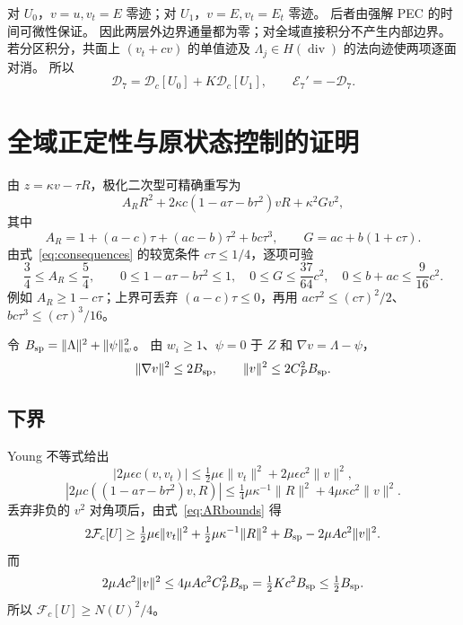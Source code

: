 \documentclass[UTF8,a4paper,11pt,fontset=none]{ctexart}
\numberwithin{equation}{section}
\theoremstyle{definition}
\theoremstyle{definition}
\newcommand{\eps}{\epsilon}
\newcommand{\Ecal}{\mathcal E}
\newcommand{\Dcal}{\mathcal D}
\newcommand{\Fc}{\mathcal F_c}
\newcommand{\Dc}{\mathcal D_c}
\DeclareMathOperator{\diver}{div}
\begin{document}
对 $U_0$，$v=u,v_t=E$ 零迹；对 $U_1$，$v=E,v_t=E_t$ 零迹。
后者由强解 PEC 的时间可微性保证。
因此两层外边界通量都为零；对全域直接积分不产生内部边界。
若分区积分，共面上 $(v_t+cv)$ 的单值迹及 $\Lambda_j\in H(\diver)$ 的法向迹使两项逐面对消。
所以
\begin{equation}\label{eq:D7exact}
 \Dcal_7=\Dc[U_0]+K\Dc[U_1],\qquad \Ecal_7'=-\Dcal_7.
\end{equation}

\section{全域正定性与原状态控制的证明}
\label{sec:coercivity}

由 $z=\kappa v-\tau R$，极化二次型可精确重写为
\begin{equation}\label{eq:reduced-polar}
 A_RR^2+2\kappa c(1-a\tau-b\tau^2)vR+\kappa^2Gv^2,
\end{equation}
其中
\[
 A_R=1+(a-c)\tau+(ac-b)\tau^2+bc\tau^3,
 \qquad G=ac+b(1+c\tau).
\]
由式~\eqref{eq:consequences} 的较宽条件 $c\tau\le1/4$，逐项可验
\begin{equation}\label{eq:ARbounds}
 \frac34\le A_R\le\frac54,\qquad
 0\le1-a\tau-b\tau^2\le1,
 \quad 0\le G\le\frac{37}{64}c^2,
 \quad 0\le b+ac\le\frac9{16}c^2.
\end{equation}
例如 $A_R\ge1-c\tau$；上界可丢弃 $(a-c)\tau\le0$，再用
$ac\tau^2\le(c\tau)^2/2$、$bc\tau^3\le(c\tau)^3/16$。

令 $B_{\rm sp}=\|\Lambda\|^2+\|\psi\|_w^2$。
由 $w_i\ge1$、$\psi=0$ 于 $Z$ 和 $\nabla v=\Lambda-\psi$，
\begin{equation}\label{eq:spcontrols}
 \|\nabla v\|^2\le2B_{\rm sp},\qquad
 \|v\|^2\le2C_P^2B_{\rm sp}.
\end{equation}

\subsection{下界}
Young 不等式给出
\[
 |2\mu\eps c(v,v_t)|\le\tfrac12\mu\eps\|v_t\|^2
                              +2\mu\eps c^2\|v\|^2,
\]
\[
 |2\mu c((1-a\tau-b\tau^2)v,R)|
 \le\tfrac14\mu\kappa^{-1}\|R\|^2+4\mu\kappa c^2\|v\|^2.
\]
丢弃非负的 $v^2$ 对角项后，由式~\eqref{eq:ARbounds} 得
\[
 2\Fc[U]\ge\tfrac12\mu\eps\|v_t\|^2+\tfrac12\mu\kappa^{-1}\|R\|^2
              +B_{\rm sp}-2\mu A c^2\|v\|^2.
\]
而
\[
 2\mu A c^2\|v\|^2\le4\mu A c^2C_P^2B_{\rm sp}
  =\tfrac12Kc^2B_{\rm sp}\le\tfrac12B_{\rm sp}.
\]
所以 $\Fc[U]\ge N(U)^2/4$。
\end{document}
